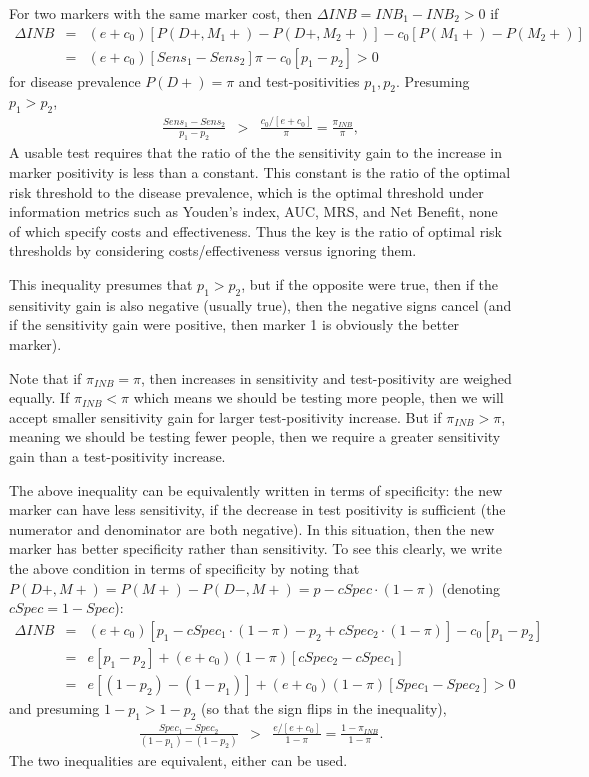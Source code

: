 \documentclass[11pt]{article}
\begin{document}
For two markers with the same marker cost, then $\Delta INB=INB_1-INB_2>0$ if
\begin{eqnarray*}
\Delta INB &=& (e+c_0)[P(D+,M_1+)-P(D+,M_2+)] - c_0[P(M_1+)-P(M_2+)]\\
           &=& (e+c_0)[Sens_1-Sens_2]\pi - c_0[p_1-p_2] > 0
\end{eqnarray*}
for disease prevalence $P(D+)=\pi$ and test-positivities $p_1,p_2$.  Presuming $p_1>p_2$,
\begin{eqnarray}
\frac{Sens_1-Sens_2}{p_1-p_2} &>& \frac{c_0/[e+c_0]}{\pi} = \frac{\pi_{INB}}{\pi},
\end{eqnarray}
A usable test requires that the ratio of the the sensitivity gain to the increase in marker positivity is less than a constant.  This constant is the ratio of the optimal risk threshold to the disease prevalence, which is the optimal threshold under information metrics such as Youden's index, AUC, MRS, and Net Benefit, none of which specify costs and effectiveness.  Thus the key is the ratio of optimal risk thresholds by considering costs/effectiveness versus ignoring them.

This inequality presumes that $p_1>p_2$, but if the opposite were true, then if the sensitivity gain is also negative (usually true), then the negative signs cancel (and if the sensitivity gain were positive, then marker 1 is obviously the better marker).  

Note that if $\pi_{INB}=\pi$, then increases in sensitivity and test-positivity are weighed equally.  If $\pi_{INB}<\pi$ which means we should be testing more people, then we will accept smaller sensitivity gain for larger test-positivity increase.  But if $\pi_{INB}>\pi$, meaning we should be testing fewer people, then we require a greater sensitivity gain than a test-positivity increase.  

The above inequality can be equivalently written in terms of specificity: the new marker can have less sensitivity, if the decrease in test positivity is sufficient (the numerator and denominator are both negative).  In this situation, then the new marker has better specificity rather than sensitivity.  To see this clearly, we write the above condition in terms of specificity by noting that $P(D+,M+)=P(M+)-P(D-,M+)=p-cSpec\cdot(1-\pi)$ (denoting $cSpec=1-Spec$):
\begin{eqnarray*}
\Delta INB &=& (e+c_0)[p_1-cSpec_1\cdot(1-\pi) - p_2+cSpec_2\cdot(1-\pi)] - c_0[p_1-p_2]\\
           &=& e[p_1-p_2] +  (e+c_0)(1-\pi)[cSpec_2-cSpec_1]\\
           &=& e[(1-p_2)-(1-p_1)] + (e+c_0)(1-\pi)[Spec_1-Spec_2] >0
\end{eqnarray*}
and presuming $1-p_1>1-p_2$ (so that the sign flips in the inequality),
\begin{eqnarray*}
\frac{Spec_1-Spec_2}{(1-p_1)-(1-p_2)} &>& \frac{e/[e+c_0]}{1-\pi} = \frac{1-\pi_{INB}}{1-\pi}.
\end{eqnarray*}
The two inequalities are equivalent, either can be used.  
\end{document}

